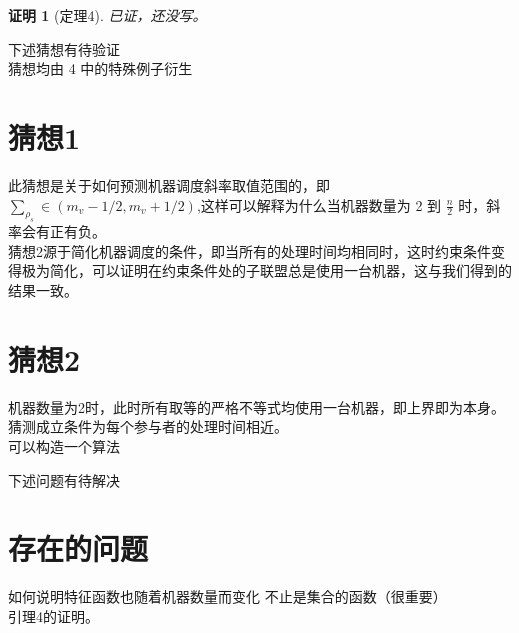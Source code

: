 \documentclass[UTF8]{article}
\newtheorem{pf}{\hspace{2em}证明}
\begin{document}
\begin{pf}[定理4]

已证，还没写。
\end{pf}



下述猜想有待验证   \\
猜想均由 4 中的特殊例子衍生
\section*{猜想1}
此猜想是关于如何预测机器调度斜率取值范围的，即
$\sum_{\rho_s} \in (m_v-1/2,m_v+1/2)$,这样可以解释为什么当机器数量为 2 到 $\frac{n}{2}$ 时，斜率会有正有负。\\


猜想2源于简化机器调度的条件，即当所有的处理时间均相同时，这时约束条件变得极为简化，可以证明在约束条件处的子联盟总是使用一台机器，这与我们得到的结果一致。

\section*{猜想2}

机器数量为2时，此时所有取等的严格不等式均使用一台机器，即上界即为本身。
猜测成立条件为每个参与者的处理时间相近。\\


可以构造一个算法


下述问题有待解决
\section{存在的问题}
如何说明特征函数也随着机器数量而变化   不止是集合的函数（很重要）   \\


引理4的证明。
\end{document}
